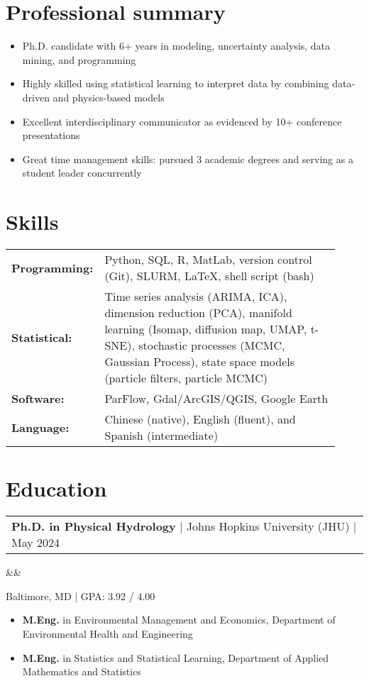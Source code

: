\documentclass[12pt,letterpaper,sans]{moderncv}        %
\makeatletter
\newcommand*{\customcvproject}[4][.25em]{
  \begin{tabular}{@{}l} 
    {\bfseries #2} { #3}
  \end{tabular}


      

  \ifx&#4&%
  \else{\\%
    \begin{minipage}{\maincolumnwidth}%
      \small#4%
    \end{minipage}}\fi%
  \par\addvspace{#1}}
\makeatother
\begin{document}
\section{Professional summary}
{\begin{itemize}
  \item Ph.D. candidate with 6+ years in modeling, uncertainty analysis, data mining, and programming
  \item Highly skilled using statistical learning to interpret data by combining data-driven and physics-based models
  \item Excellent interdisciplinary communicator as evidenced by 10+ conference presentations
  \item Great time management skills: pursued 3 academic degrees and serving as a student leader concurrently
\end{itemize}

\section{Skills}

\begin{tabular}{p{0.12\linewidth}  p{0.8\linewidth}}
\textbf{Programming:} & Python, SQL, R, MatLab, version control (Git), SLURM, \LaTeX, shell script (bash)\\
\textbf{Statistical:} & Time series analysis (ARIMA, ICA), dimension reduction (PCA), manifold learning (Isomap, diffusion map, UMAP, t-SNE), stochastic processes (MCMC, Gaussian Process), state space models (particle filters, particle MCMC)\\
\textbf{Software:} &ParFlow, Gdal/ArcGIS/QGIS, Google Earth \\
\textbf{Language:}& Chinese (native), English (fluent), and Spanish (intermediate)
\end{tabular}


\section{Education}
{\customcvproject{Ph.D. in Physical Hydrology}{| Johns Hopkins University (JHU) | May 2024}{}}
Baltimore, MD | GPA: 3.92 / 4.00
\begin{itemize}
  \item  \textbf{M.Eng.} in Environmental Management and Economics, Department of Environmental Health and Engineering
  \item \textbf{M.Eng.} in Statistics and Statistical Learning, Department of Applied Mathematics and Statistics
\end{itemize}


}
\end{document}
